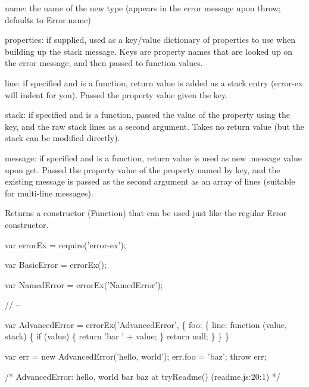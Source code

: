 \begin{DoxyItemize}
\item {\ttfamily name}\+: the name of the new type (appears in the error message upon throw; defaults to {\ttfamily Error.\+name})
\item {\ttfamily properties}\+: if supplied, used as a key/value dictionary of properties to use when building up the stack message. Keys are property names that are looked up on the error message, and then passed to function values.
\begin{DoxyItemize}
\item {\ttfamily line}\+: if specified and is a function, return value is added as a stack entry (error-\/ex will indent for you). Passed the property value given the key.
\end{DoxyItemize}
\end{DoxyItemize}

{\ttfamily stack}\+: if specified and is a function, passed the value of the property using the key, and the raw stack lines as a second argument. Takes no return value (but the stack can be modified directly).
\begin{DoxyItemize}
\item {\ttfamily message}\+: if specified and is a function, return value is used as new {\ttfamily .message} value upon get. Passed the property value of the property named by key, and the existing message is passed as the second argument as an array of lines (suitable for multi-\/line messages).
\end{DoxyItemize}

Returns a constructor (Function) that can be used just like the regular Error constructor.


\begin{DoxyCode}
var errorEx = require('error-ex');

var BasicError = errorEx();

var NamedError = errorEx('NamedError');

// --

var AdvancedError = errorEx('AdvancedError', \{
    foo: \{
        line: function (value, stack) \{
            if (value) \{
                return 'bar ' + value;
            \}
            return null;
        \}
    \}
\}

var err = new AdvancedError('hello, world');
err.foo = 'baz';
throw err;

/*
    AdvancedError: hello, world
        bar baz
        at tryReadme() (readme.js:20:1)
*/
\end{DoxyCode}



